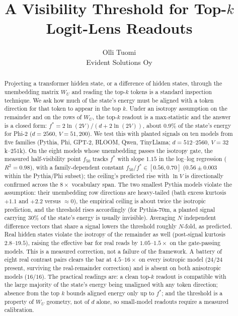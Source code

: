 \documentclass[11pt]{article}
\title{A Visibility Threshold for Top-$k$ Logit-Lens Readouts}
\author{Olli Tuomi\\Evident Solutions Oy}
\date{}
\newcommand{\WU}{W_U}
\newcommand{\fstar}{f^{*}}
\begin{document}
\maketitle

\begin{abstract}
Projecting a transformer hidden state, or a difference of hidden
states, through the unembedding matrix $\WU$ and reading the top-$k$
tokens is a standard inspection technique. We ask how much of the
state's energy must be aligned with a token direction for that token
to appear in the top $k$. Under an isotropy assumption on the
remainder and on the rows of $\WU$, the top-$k$ readout is a
max-statistic and the answer is a closed form:
$\fstar = 2\ln(2V)/(d + 2\ln(2V))$, about $0.9\%$ of the state's
energy for Phi-2 ($d{=}2560$, $V{=}51{,}200$). We test this with
planted signals on ten models from five families (Pythia, Phi,
GPT-2, BLOOM, Qwen, TinyLlama; $d = 512$--$2560$,
$V = 32$k--$251$k). On the eight models whose unembedding passes the
isotropy gate, the measured half-visibility point $f_{50}$ tracks
$\fstar$ with slope $1.15$ in the log--log regression
($R^2 = 0.98$), with a family-dependent constant
$f_{50}/\fstar \in [0.56, 0.70]$ ($0.56 \pm 0.003$ within the
Pythia/Phi subset); the ceiling's predicted rise with $\ln V$ is
directionally confirmed across the $8\times$ vocabulary span. The
two smallest Pythia models violate the assumption: their unembedding
row directions are heavy-tailed (bath excess kurtosis $+1.1$ and
$+2.2$ versus $\approx 0$), the empirical ceiling is about twice the
isotropic prediction, and the threshold rises accordingly (for
Pythia-70m, a planted signal carrying $30\%$ of the state's energy is
usually invisible). Averaging $N$ independent difference vectors that
share a signal lowers the threshold roughly $N$-fold, as predicted.
Real hidden states violate the isotropy of the remainder as well
(post-signal kurtosis $2.8$--$19.5$), raising the effective bar for
real reads by $1.05$--$1.5\times$ on the gate-passing models. This is a
measured correction, not a failure of the framework. A battery of
eight real contrast pairs clears the bar at $4.5$--$16\times$ on
every isotropic model ($24/24$ present, surviving the real-remainder
correction) and is absent on both anisotropic models ($16/16$). The practical readings are: a
clean top-$k$ readout is compatible with the large majority of the
state's energy being unaligned with any token direction; absence
from the top $k$ bounds aligned energy only up to $\fstar$; and the
threshold is a property of $\WU$ geometry, not of $d$ alone, so
small-model readouts require a measured calibration.
\end{abstract}
\end{document}
